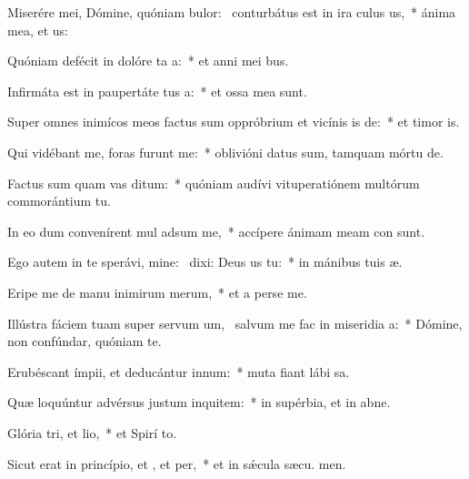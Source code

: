 \item Miserére mei, Dómine, quóniam bulor:~\pscross{} conturbátus est in ira culus us,~* ánima mea, et  us:
\item Quóniam defécit in dolóre ta a:~* et anni mei  bus.
\item Infirmáta est in paupertáte tus a:~* et ossa mea  sunt.
\item Super omnes inimícos meos factus sum oppróbrium et vicínis is de:~* et timor  is.
\item Qui vidébant me, foras furunt  me:~* oblivióni datus sum, tamquam mórtu  de.
\item Factus sum quam vas ditum:~* quóniam audívi vituperatiónem multórum commorántium  tu.
\item In eo dum convenírent mul adsum me,~* accípere ánimam meam con sunt.
\item Ego autem in te sperávi, mine:~\pscross{} dixi: Deus us  tu:~* in mánibus tuis  æ.
\item Eripe me de manu inimirum merum,~* et a perse me.
\item Illústra fáciem tuam super servum um,~\pscross{} salvum me fac in miseridia a:~* Dómine, non confúndar, quóniam  te.
\item Erubéscant ímpii, et deducántur  innum:~* muta fiant lábi sa.
\item Quæ loquúntur advérsus justum inquitem:~* in supérbia, et in abne.
\item Glória tri, et lio,~* et Spirí to.
\item Sicut erat in princípio, et , et per,~* et in sǽcula sæcu. men.
